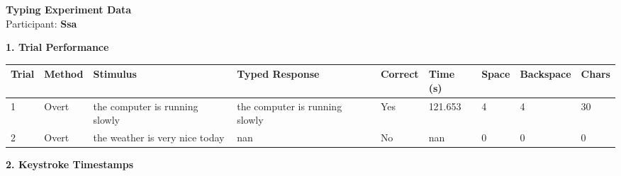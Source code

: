 \documentclass[10pt,a4paper]{article}
\begin{document}

\begin{center}
    {\Large\bfseries Typing Experiment Data}\\
    \vspace{2pt}
    Participant: \textbf{Ssa}
\end{center}

\vspace{0.25cm}


\noindent
{\large\bfseries 1. Trial Performance}

\vspace{0.08cm}

\begin{center}
\begin{tabularx}{\textwidth}{
    C{0.45in}
    C{0.65in}
    L{2.35in}
    L{2.55in}
    C{0.65in}
    C{0.65in}
    C{0.55in}
    C{0.75in}
    C{0.55in}
}
\toprule

\textbf{Trial} &
\textbf{Method} &
\textbf{Stimulus} &
\textbf{Typed Response} &
\textbf{Correct} &
\textbf{Time (s)} &
\textbf{Space} &
\textbf{Backspace} &
\textbf{Chars}
\\

\midrule

1 &
Overt &
the computer is running slowly &
the computer is running slowly &
Yes &
121.653 &
4 &
4 &
30
\\

2 &
Overt &
the weather is very nice today &
nan &
No &
nan &
0 &
0 &
0
\\

\bottomrule
\end{tabularx}
\end{center}

\vspace{0.35cm}


\noindent
{\large\bfseries 2. Keystroke Timestamps}

\vspace{0.08cm}
\end{document}

